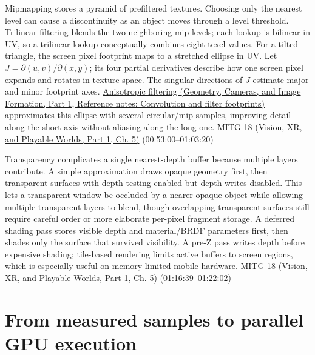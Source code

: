Mipmapping stores a pyramid of prefiltered textures. Choosing only the nearest level can cause a discontinuity as an object moves through a level threshold. Trilinear filtering blends the two neighboring mip levels; each lookup is bilinear in UV, so a trilinear lookup conceptually combines eight texel values. For a tilted triangle, the screen pixel footprint maps to a stretched ellipse in UV. Let \(J=\partial(u,v)/\partial(x,y)\); its four partial derivatives describe how one screen pixel expands and rotates in texture space. The \hyperref[appendix-1fad5e7f36fa]{singular directions} of \(J\) estimate major and minor footprint axes. \href{../03-Geometry-Cameras-and-Image-Formation-P01/main.pdf\#nameddest=appendix-d5b3c692d9f0}{Anisotropic filtering (Geometry, Cameras, and Image Formation, Part 1, Reference notes: Convolution and filter footprints)} approximates this ellipse with several circular/mip samples, improving detail along the short axis without aliasing along the long one. \href{../07-Vision-XR-and-Playable-Worlds-P01/main.pdf\#nameddest=04-visual-computing-ii-ch036-mitg-18---rasterization-ii}{MITG-18 (Vision, XR, and Playable Worlds, Part 1, Ch. 5)} (00:53:00--01:03:20)

Transparency complicates a single nearest-depth buffer because multiple layers contribute. A simple approximation draws opaque geometry first, then transparent surfaces with depth testing enabled but depth writes disabled. This lets a transparent window be occluded by a nearer opaque object while allowing multiple transparent layers to blend, though overlapping transparent surfaces still require careful order or more elaborate per-pixel fragment storage. A deferred shading pass stores visible depth and material/BRDF parameters first, then shades only the surface that survived visibility. A pre-Z pass writes depth before expensive shading; tile-based rendering limits active buffers to screen regions, which is especially useful on memory-limited mobile hardware. \href{../07-Vision-XR-and-Playable-Worlds-P01/main.pdf\#nameddest=04-visual-computing-ii-ch036-mitg-18---rasterization-ii}{MITG-18 (Vision, XR, and Playable Worlds, Part 1, Ch. 5)} (01:16:39--01:22:02)

\section{From measured samples to parallel GPU execution}\label{03-visual-computing-i-ch015-from-measured-samples-to-parallel-gpu-execution}

\hypertarget{03-visual-computing-i-ch015-from-measured-samples-to-parallel-gpu-execution}{}

